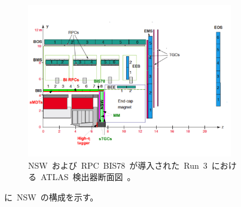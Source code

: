 \begin{figure}[tbp]
        \centering   
        \includegraphics[width=0.8\textwidth,page=1]{img/pdf/ch01_fig_03a.pdf}
        \caption[NSW~および~RPC~BIS78~が導入された~Run~3~における~ATLAS~検出器断面図]{NSW~および~RPC~BIS78~が導入された~Run~3~における~ATLAS~検出器断面図~\cite{TR:04}。}
        \label{fig:cut3}
\end{figure}
に~NSW~の構成を示す。
